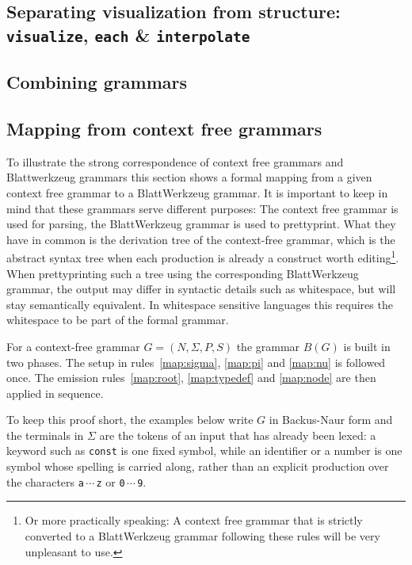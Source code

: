 \documentclass[]{report}
\begin{document}
\subsection{Separating visualization from structure: \texttt{visualize}, \texttt{each} \& \texttt{interpolate}}
\label{sec:visualising-grammars}

\subsection{Combining grammars}
\label{sec:combining-grammars}

\subsection{Mapping from context free grammars}
\label{sec:cfg-mapping}
To illustrate the strong correspondence of context free grammars and Blattwerkzeug grammars this section shows a formal mapping from a given context free grammar to a Blatt\-Werkzeug grammar. It is important to keep in mind that these grammars serve different purposes: The context free grammar is used for parsing, the Blatt\-Werkzeug grammar is used to prettyprint. What they have in common is the derivation tree of the context-free grammar, which is the abstract syntax tree when each production is already a construct worth editing\footnote{Or more practically speaking: A context free grammar that is strictly converted to a Blatt\-Werkzeug grammar following these rules will be very unpleasant to use.}. When prettyprinting such a tree using the corresponding Blatt\-Werkzeug grammar, the output may differ in syntactic details such as whitespace, but will stay semantically equivalent. In whitespace sensitive languages this requires the whitespace to be part of the formal grammar.

For a context-free grammar $G = (N, \Sigma, P, S)$ the grammar $B(G)$ is built in two phases. The setup in rules~\ref{map:sigma}, \ref{map:pi} and \ref{map:nu} is followed once. The emission rules~\ref{map:root}, \ref{map:typedef} and \ref{map:node} are then applied in sequence.

To keep this proof short, the examples below write $G$ in Backus-Naur form and the terminals in $\Sigma$ are the tokens of an input that has already been lexed: a keyword such as \texttt{const} is one fixed symbol, while an identifier or a number is one symbol whose spelling is carried along, rather than an explicit production over the characters \texttt{a}$\,\cdots\,$\texttt{z} or \texttt{0}$\,\cdots\,$\texttt{9}.
\end{document}
